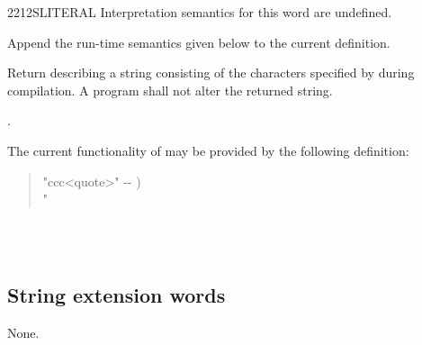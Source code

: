 \begin{worddef}{2212}{SLITERAL}
\interpret
	Interpretation semantics for this word are undefined.

\compile

	Append the run-time semantics given below to the current
	definition.

\runtime

	Return  describing a string consisting of
	the characters specified by  during
	compilation. A program shall not alter the returned string.

\see {}.

	\begin{rationale} %
		The current functionality of  may be
		provided by the following definition:
		\begin{quote}\ttfamily
			\word{:}   "ccc<quote>" -{}- ) \\
			\tab \word{[CHAR]} "  ~
				  \\
			\word{;} 
		\end{quote}
	\end{rationale}

	\begin{testing}
		 \\
		 \\
	\end{testing}
\end{worddef}


\subsection{String extension words} %

None.
